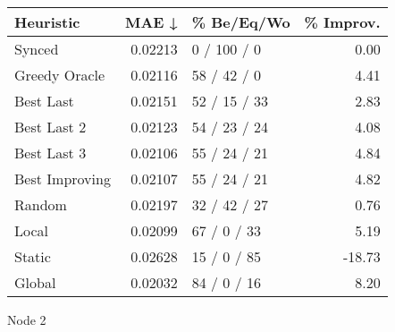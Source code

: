 \begin{tabular}{lrlr}
\toprule
\textbf{Heuristic} & \textbf{MAE ↓} & \textbf{\% Be/Eq/Wo} & \textbf{\% Improv.} \\
\midrule
            Synced &        0.02213 &          0 / 100 / 0 &                0.00 \\
     Greedy Oracle &        0.02116 &          58 / 42 / 0 &                4.41 \\
         Best Last &        0.02151 &         52 / 15 / 33 &                2.83 \\
       Best Last 2 &        0.02123 &         54 / 23 / 24 &                4.08 \\
       Best Last 3 &        0.02106 &         55 / 24 / 21 &                4.84 \\
    Best Improving &        0.02107 &         55 / 24 / 21 &                4.82 \\
            Random &        0.02197 &         32 / 42 / 27 &                0.76 \\
             Local &        0.02099 &          67 / 0 / 33 &                5.19 \\
            Static &        0.02628 &          15 / 0 / 85 &              -18.73 \\
            Global &        0.02032 &          84 / 0 / 16 &                8.20 \\
\bottomrule
\end{tabular}
\caption{Node 2}
\label{tab:iid_lr01_le1_bs4_2}
